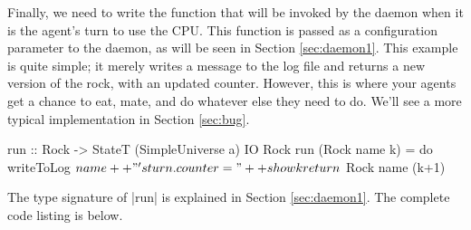 Finally, we need to write the function that will be
invoked by the daemon when it is the agent's turn to use the CPU.
This function is passed as a configuration parameter to the daemon,
as will be seen in Section \ref{sec:daemon1}.
This example is quite simple;
it merely writes a message to the log file
and returns a new version of the rock, with an updated counter.
However, this is where your agents get a chance to eat, mate, 
and do whatever else they need to do.
We'll see a more typical implementation in Section
\ref{sec:bug}.

\begin{code}
run :: Rock -> StateT (SimpleUniverse a) IO Rock
run (Rock name k) = do
  writeToLog $ name ++ "'s turn. counter=" ++ show k 
  return $ Rock name (k+1)
\end{code}

The type signature of |run| is explained in Section \ref{sec:daemon1}.
The complete code listing is below.
\label{code:rock}

